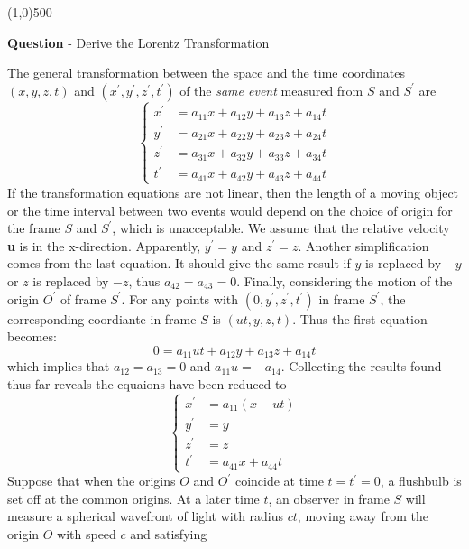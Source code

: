 \documentclass{article}
\numberwithin{equation}{section}
\numberwithin{figure}{section}
\newcommand{\hr}{\begin{center} \line(1,0){500} \end{center}}
\begin{document}
	\hr{\bf Question} - Derive the Lorentz Transformation
	
	The general transformation between the space and the time coordinates $(x,y,z,t)$ and $(x^\prime,y^\prime,z^\prime,t^\prime)$ of the {\it same event} measured from $S$ and $S^\prime$ are
	\begin{equation}
		\begin{cases}
			x^\prime &= a_{11}x + a_{12}y + a_{13}z + a_{14}t \\
			y^\prime &= a_{21}x + a_{22}y + a_{23}z + a_{24}t \\
			z^\prime &= a_{31}x + a_{32}y + a_{33}z + a_{34}t \\
			t^\prime &= a_{41}x + a_{42}y + a_{43}z + a_{44}t
		\end{cases}
	\end{equation}
	If the transformation equations are not linear, then the length of a moving object or the time interval between two events would depend on the choice of origin for the frame $S$ and $S^\prime$, which is unacceptable. We assume that the relative velocity {\bf u} is in the x-direction. Apparently, $y^\prime=y$ and $z^\prime=z$. Another simplification comes from the last equation. It should give the same result if $y$ is replaced by $-y$ or $z$ is replaced by $-z$, thus $a_{42} = a_{43} = 0$. Finally, considering the motion of the origin $O^\prime$ of frame $S^\prime$. For any points with $(0,y^\prime,z^\prime,t^\prime)$ in frame $S^\prime$, the corresponding coordiante in frame $S$ is $(ut,y,z,t)$. Thus the first equation becomes:
	\begin{equation}
		0 = a_{11}ut + a_{12}y + a_{13}z + a_{14}t
	\end{equation}
	which implies that $a_{12} = a_{13} = 0$ and $a_{11}u = -a_{14}$. Collecting the results found thus far reveals the equaions have been reduced to
	\begin{equation}
		\begin{cases}
			x^\prime &= a_{11}(x-ut) \\
			y^\prime &= y \\
			z^\prime &= z \\
			t^\prime &= a_{41}x + a_{44}t
		\end{cases}
	\end{equation}
	Suppose that when the origins $O$ and $O^\prime$ coincide at time $t=t^\prime=0$, a flushbulb is set off at the common origins. At a later time $t$, an observer in frame $S$ will measure a spherical wavefront of light with radius $ct$, moving away from the origin $O$ with speed $c$ and satisfying
\end{document}
